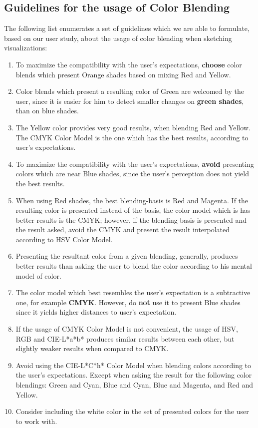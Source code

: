 \subsection{Guidelines for the usage of Color Blending}
\label{subsec:guidelines}
%
The following list enumerates a set of guidelines which we are able to formulate, based on our user study, about the usage of color blending when sketching visualizations:
%
\begin{enumerate}
  \item To maximize the compatibility with the user's expectations, \textbf{choose} color blends which present Orange shades based on mixing Red and Yellow.
  \item Color blends which present a resulting color of Green are welcomed by the user, since it is easier for him to detect smaller changes on \textbf{green shades}, than on blue shades.
  \item The Yellow color provides very good results, when blending Red and Yellow. The CMYK Color Model is the one which has the best results, according to user's expectations.
  \item To maximize the compatibility with the user's expectations, \textbf{avoid} presenting colors which are near Blue shades, since the user's perception does not yield the best results.
  \item When using Red shades, the best blending-basis is Red and Magenta. If the resulting color is presented instead of the basis, the color model which is has better results is the CMYK; however,
  if the blending-basis is presented and the result asked, avoid the CMYK and present the result interpolated according to HSV Color Model.
  \item Presenting the resultant color from a given blending, generally, produces better results than asking the user to blend the color according to his mental model of color.
  \item The color model which best resembles the user's expectation is a subtractive one, for example \textbf{CMYK}. However, do \textbf{not} use it to present Blue shades since it yields higher distances to user's expectation.
  \item If the usage of CMYK Color Model is not convenient, the usage of HSV, RGB and CIE-L*a*b* produces similar results between each other, but slightly weaker results when compared to CMYK.
  \item Avoid using the CIE-L*C*h* Color Model when blending colors according to the user's expectations. Except when asking the result for the following color blendings: Green and Cyan, Blue and Cyan, Blue and Magenta, and
  Red and Yellow.
  \item Consider including the white color in the set of presented colors for the user to work with.
\end{enumerate}
%
